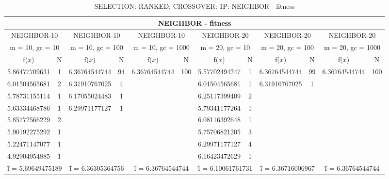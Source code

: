 \begin{table}[H]
	\centering
	\caption{SELECTION: RANKED; CROSSOVER: 1P: NEIGHBOR - fitness}
	\begin{adjustbox}{width=1\textwidth}
		\begin{tabular}{ |c|c||c|c||c|c||c|c||c|c||c|c| }
			\hline
			\multicolumn{12}{|c|}{NEIGHBOR - fitness} \\
			\hline
			\multicolumn{2}{|c||}{NEIGHBOR-10} & \multicolumn{2}{c||}{NEIGHBOR-10} & \multicolumn{2}{c||}{NEIGHBOR-10} & \multicolumn{2}{c||}{NEIGHBOR-20} & \multicolumn{2}{c||}{NEIGHBOR-20} & \multicolumn{2}{c|}{NEIGHBOR-20}\\
			\hline
			\multicolumn{2}{|c||}{m = 10, gc = 10} & \multicolumn{2}{c||}{m = 10, gc = 100} & \multicolumn{2}{c||}{m = 10, gc = 1000} & \multicolumn{2}{c||}{m = 20, gc = 10} & \multicolumn{2}{c||}{m = 20, gc = 100} & \multicolumn{2}{c|}{m = 20, gc = 1000}\\
			\hline
			f($\bar{x}$) & N & f($\bar{x}$) & N & f($\bar{x}$) & N & f($\bar{x}$) & N & f($\bar{x}$) & N & f($\bar{x}$) & N\\
			\hline
			\hline
			5.86477709631 & 1 & 6.36764544744 & 94 & 6.36764544744 & 100 & 5.57702494247 & 1 & 6.36764544744 & 99 & 6.36764544744 & 100\\
			6.01504565681 & 2 & 6.31910767025 & 4 &   &   & 6.01504565681 & 1 & 6.31910767025 & 1 &   &  \\
			5.78731155114 & 1 & 6.17055024483 & 1 &   &   & 6.25117399409 & 2 &   &   &   &  \\
			5.63334468786 & 1 & 6.29971177127 & 1 &   &   & 5.79341177264 & 1 &   &   &   &  \\
			5.85772566229 & 2 &   &   &   &   & 6.08116392648 & 1 &   &   &   &  \\
			5.90192275292 & 1 &   &   &   &   & 5.75706821205 & 3 &   &   &   &  \\
			5.22471147077 & 1 &   &   &   &   & 6.29971177127 & 4 &   &   &   &  \\
			4.92904954885 & 1 &   &   &   &   & 6.16423472629 & 1 &   &   &   &  \\
			\hline
			\multicolumn{2}{|c||}{\^{f} = 5.69649475189} & \multicolumn{2}{c||}{\^{f} = 6.36305364756} & \multicolumn{2}{c||}{\^{f} = 6.36764544744} & \multicolumn{2}{c||}{\^{f} = 6.10061761731} & \multicolumn{2}{c||}{\^{f} = 6.36716006967} & \multicolumn{2}{c|}{\^{f} = 6.36764544744}\\
			\hline
		\end{tabular}
	\end{adjustbox}
\end{table}
